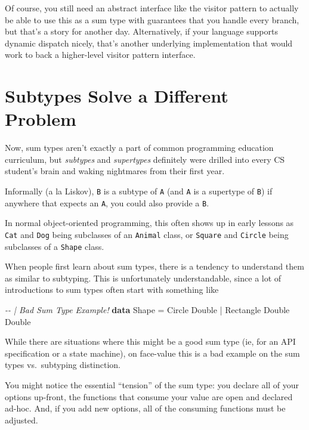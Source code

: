 \documentclass[]{article}
\newenvironment{Shaded}{}{}
\newcommand{\CommentTok}[1]{\textcolor[rgb]{0.38,0.63,0.69}{\textit{#1}}}
\newcommand{\DataTypeTok}[1]{\textcolor[rgb]{0.56,0.13,0.00}{#1}}
\newcommand{\KeywordTok}[1]{\textcolor[rgb]{0.00,0.44,0.13}{\textbf{#1}}}
\newcommand{\OperatorTok}[1]{\textcolor[rgb]{0.40,0.40,0.40}{#1}}
\newcommand{\OtherTok}[1]{\textcolor[rgb]{0.00,0.44,0.13}{#1}}
\begin{document}
Of course, you still need an abstract interface like the visitor pattern to
actually be able to use this as a sum type with guarantees that you handle every
branch, but that's a story for another day. Alternatively, if your language
supports dynamic dispatch nicely, that's another underlying implementation that
would work to back a higher-level visitor pattern interface.

\section{Subtypes Solve a Different
Problem}\label{subtypes-solve-a-different-problem}

Now, sum types aren't exactly a part of common programming education curriculum,
but \emph{subtypes} and \emph{supertypes} definitely were drilled into every CS
student's brain and waking nightmares from their first year.

Informally (a la Liskov), \texttt{B} is a subtype of \texttt{A} (and \texttt{A}
is a supertype of \texttt{B}) if anywhere that expects an \texttt{A}, you could
also provide a \texttt{B}.

In normal object-oriented programming, this often shows up in early lessons as
\texttt{Cat} and \texttt{Dog} being subclasses of an \texttt{Animal} class, or
\texttt{Square} and \texttt{Circle} being subclasses of a \texttt{Shape} class.

When people first learn about sum types, there is a tendency to understand them
as similar to subtyping. This is unfortunately understandable, since a lot of
introductions to sum types often start with something like

\begin{Shaded}
\begin{Highlighting}[]
\CommentTok{{-}{-} | Bad Sum Type Example!}
\KeywordTok{data} \DataTypeTok{Shape} \OtherTok{=} \DataTypeTok{Circle} \DataTypeTok{Double} \OperatorTok{|} \DataTypeTok{Rectangle} \DataTypeTok{Double} \DataTypeTok{Double}
\end{Highlighting}
\end{Shaded}

While there are situations where this might be a good sum type (ie, for an API
specification or a state machine), on face-value this is a bad example on the
sum types vs.~subtyping distinction.

You might notice the essential ``tension'' of the sum type: you declare all of
your options up-front, the functions that consume your value are open and
declared ad-hoc. And, if you add new options, all of the consuming functions
must be adjusted.
\end{document}
